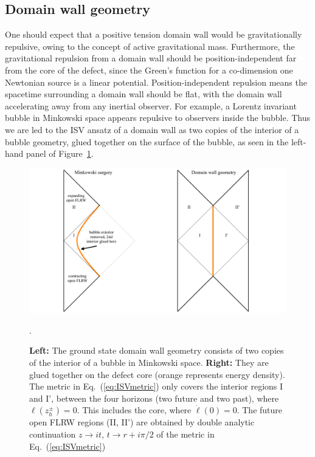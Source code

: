 \documentclass[aps,amsfonts,amsmath,prd,preprint,nofootinbib,superscriptaddress]{revtex4}
\begin{document}
\begin{appendix}
\subsection{Domain wall geometry}
One should expect that a positive tension domain wall would be gravitationally repulsive, owing to the concept of active gravitational mass.  Furthermore, 
the gravitational repulsion from a domain wall should be position-independent far from the core of the defect, since the Green's function for a co-dimension one Newtonian
source is a linear potential.  Position-independent repulsion means the spacetime surrounding a domain wall should be flat, with the domain wall accelerating away from any inertial observer.  
For example, a Lorentz invariant bubble in Minkowski space appears repulsive to observers inside the bubble.  Thus we are led to the ISV ansatz \cite{Ipser:1983db, Vilenkin:1984hy}
of a domain wall as two copies of the interior of a bubble geometry, glued together on the surface of the bubble, as seen in the left-hand panel of Figure~\ref{fig:ISV}.
\begin{figure}[htbp]
\begin{center}
\includegraphics[width=1\textwidth]{figures/ISVbubble}
\caption{{\bf Left:} The ground state domain wall geometry consists of two copies of the interior of a bubble in Minkowski space.    {\bf Right:} They are glued together on the defect core (orange represents energy density). 
The metric in Eq.~(\ref{eq:ISVmetric}) only covers the interior regions I and I', between the four horizons (two future and two past), where $\ell(z_h^\pm) = 0$.  This includes the core, where $\dot\ell(0) = 0$. The future open FLRW regions (II, II') are obtained by
double analytic continuation $z\to i t$, $t \to r + i\pi/2$ of the metric in Eq.~(\ref{eq:ISVmetric})}.
\label{fig:ISV}
\end{center}
\end{figure}



\end{appendix}
\end{document}
